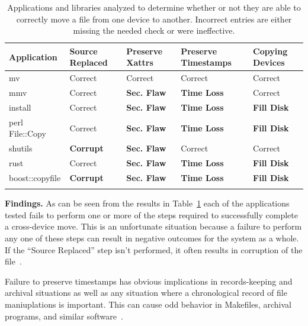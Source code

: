  \begin{table}[t]
    \scriptsize{}
    \begin{tabular}{l p{1cm} p{1cm} p{1.2cm} p{1cm}}
    \toprule{}
        Application     & Source Replaced & Preserve Xattrs & Preserve Timestamps & Copying Devices\\
\hline
        mv              & Correct             & Correct         & Correct             & Correct\\
        mmv             & Correct             & {\bf Sec. Flaw} & {\bf Time
Loss} & Correct\\
        install         & Correct             & {\bf Sec. Flaw} & {\bf Time
Loss} & {\bf Fill Disk} \\
        perl File::Copy & Correct             & {\bf Sec. Flaw} & {\bf Time
Loss} & {\bf Fill Disk} \\
        shutils         & {\bf Corrupt}	& {\bf Sec. Flaw} 	& Correct             & Correct\\
        rust            & Correct             & {\bf Sec. Flaw} & {\bf Time
Loss} & {\bf Fill Disk} \\
        boost::copyfile & {\bf Corrupt}	      & {\bf Sec. Flaw} & {\bf Time
Loss} & {\bf Fill Disk} \\
    \bottomrule{}
    \end{tabular}
    \caption{Applications and libraries analyzed to determine whether or not
      they are able to correctly move a file from one device to another.
Incorrect entries are either missing the needed check or were ineffective.
}
    \label{table:crossdevice}
\end{table}

{\bf Findings.}
As can be seen from the results in Table~\ref{table:crossdevice} each of the
applications tested fails to perform one or more of the steps required to
successfully complete a cross-device move.  This is an unfortunate situation
because a failure to perform any one of these steps can result in negative
outcomes for the system as a whole.  If the ``Source Replaced'' step isn't
performed, it often results in corruption of the file~\cite{PythonShutilBug}.

Failure to preserve timestamps has obvious
implications in records-keeping and archival situations as well as any situation
where a chronological record of file maniuplations is important.  This can 
cause odd behavior in Makefiles, archival programs, and similar
software~\cite{NautilusTimestamps, SudoTimestamp}.

